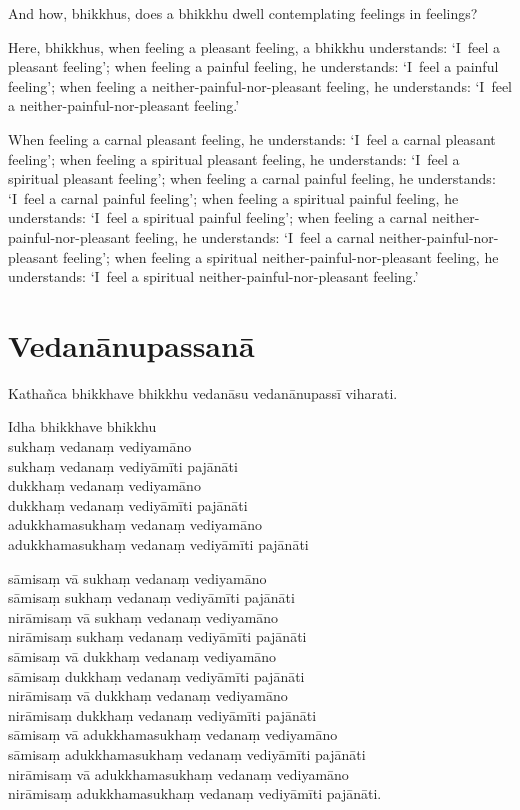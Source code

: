 And how, bhikkhus, does a bhikkhu dwell contemplating feelings in feelings?

Here, bhikkhus, when feeling a pleasant feeling, a bhikkhu understands:
`I~feel a pleasant feeling';
when feeling a painful feeling, he understands:
`I~feel a painful feeling';
when feeling a neither-painful-nor-pleasant feeling, he understands:
`I~feel a neither-painful-nor-pleasant feeling.'

When feeling a carnal pleasant feeling, he understands:
`I~feel a carnal pleasant feeling';
when feeling a spiritual pleasant feeling, he understands:
`I~feel a spiritual pleasant feeling';
when feeling a carnal painful feeling, he understands:
`I~feel a carnal painful feeling';
when feeling a spiritual painful feeling, he understands:
`I~feel a spiritual painful feeling';
when feeling a carnal neither-painful-nor-pleasant feeling, he understands:
`I~feel a carnal neither-painful-nor-pleasant feeling';
when feeling a spiritual neither-painful-nor-pleasant feeling, he understands:
`I~feel a spiritual neither-painful-nor-pleasant feeling.'

\paliPage
\chapter*{Vedanānupassanā}

Kathañca bhikkhave bhikkhu vedanāsu vedanānupassī viharati.

Idha bhikkhave bhikkhu\\
sukhaṃ vedanaṃ vediyamāno\\
sukhaṃ vedanaṃ vediyāmīti pajānāti\\
dukkhaṃ vedanaṃ vediyamāno\\
dukkhaṃ vedanaṃ vediyāmīti pajānāti\\
adukkhamasukhaṃ vedanaṃ vediyamāno\\
adukkhamasukhaṃ vedanaṃ vediyāmīti pajānāti

sāmisaṃ vā sukhaṃ vedanaṃ vediyamāno\\
sāmisaṃ sukhaṃ vedanaṃ vediyāmīti pajānāti\\
nirāmisaṃ vā sukhaṃ vedanaṃ vediyamāno\\
nirāmisaṃ sukhaṃ vedanaṃ vediyāmīti pajānāti\\
sāmisaṃ vā dukkhaṃ vedanaṃ vediyamāno\\
sāmisaṃ dukkhaṃ vedanaṃ vediyāmīti pajānāti\\
nirāmisaṃ vā dukkhaṃ vedanaṃ vediyamāno\\
nirāmisaṃ dukkhaṃ vedanaṃ vediyāmīti pajānāti\\
sāmisaṃ vā adukkhamasukhaṃ vedanaṃ vediyamāno\\
sāmisaṃ adukkhamasukhaṃ vedanaṃ vediyāmīti pajānāti\\
nirāmisaṃ vā adukkhamasukhaṃ vedanaṃ vediyamāno\\
nirāmisaṃ adukkhamasukhaṃ vedanaṃ vediyāmīti pajānāti.

